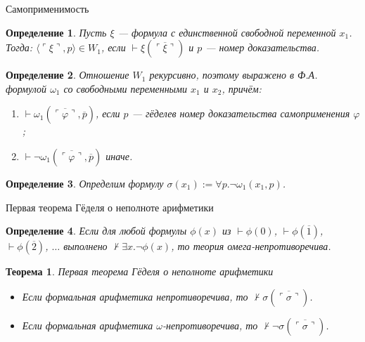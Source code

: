 \documentclass[aspectratio=169]{beamer}
\newtheorem{thm}{Теорема}[section]
\newtheorem{dfn}{Определение}[section]
\begin{document}
\newcommand\doubleplus{+\kern-1.3ex+\kern0.8ex}
\newcommand\mdoubleplus{\ensuremath{\mathbin{+\mkern-10mu+}}}

\begin{frame}{Самоприменимость}
\begin{dfn}Пусть $\xi$ --- формула с единственной свободной
переменной $x_1$. Тогда:
$\langle\ulcorner \xi \urcorner,p\rangle \in W_1$, если $\vdash \xi(\overline{\ulcorner \xi \urcorner})$ и $p$ --- номер доказательства.
\end{dfn}

\begin{dfn}Отношение $W_1$ рекурсивно, поэтому выражено в Ф.А. формулой $\omega_1$ со свободными переменными $x_1$ и $x_2$, причём:
\begin{enumerate}
\item $\vdash \omega_1(\overline{\ulcorner \varphi \urcorner},\overline{p})$, если $p$ --- гёделев номер
доказательства самоприменения $\varphi$;
\item $\vdash \neg\omega_1(\overline{\ulcorner \varphi \urcorner},\overline{p})$ иначе.
\end{enumerate}
\end{dfn}

\begin{dfn}
Определим формулу $\sigma(x_1) := \forall p.\neg\omega_1(x_1,p)$. 
\end{dfn}
\end{frame}

\begin{frame}{Первая теорема Гёделя о неполноте арифметики}
\begin{dfn}Если для любой формулы $\phi(x)$ из $\vdash\phi(0)$, $\vdash\phi(\overline{1})$,
$\vdash\phi(\overline{2})$, $\dots$ выполнено $\not\vdash\exists x.\neg\phi(x)$, 
то теория \emph{омега-непротиворечива}.
\end{dfn}

\begin{thm}{Первая теорема Гёделя о неполноте арифметики}
\begin{itemize}
\item Если формальная арифметика непротиворечива, то $\not\vdash\sigma(\overline{\ulcorner\sigma\urcorner})$.
\item Если формальная арифметика $\omega$-непротиворечива, то $\not\vdash\neg\sigma(\overline{\ulcorner\sigma\urcorner})$.
\end{itemize}
\end{thm}
\end{frame}
\end{document}
